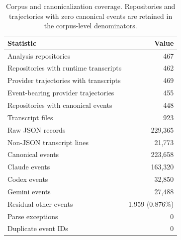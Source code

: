 \begin{table}[t]
\centering
\small
\begin{tabular}{lr}
\toprule
Statistic & Value \\
\midrule
Analysis repositories & 467 \\
Repositories with runtime transcripts & 462 \\
Provider trajectories with transcripts & 469 \\
Event-bearing provider trajectories & 455 \\
Repositories with canonical events & 448 \\
Transcript files & 923 \\
Raw JSON records & 229,365 \\
Non-JSON transcript lines & 21,773 \\
Canonical events & 223,658 \\
Claude events & 163,320 \\
Codex events & 32,850 \\
Gemini events & 27,488 \\
Residual other events & 1,959 (0.876\%) \\
Parse exceptions & 0 \\
Duplicate event IDs & 0 \\
\bottomrule
\end{tabular}
\caption{Corpus and canonicalization coverage. Repositories and trajectories with zero canonical events are retained in the corpus-level denominators.}
\label{tab:corpus}
\end{table}
